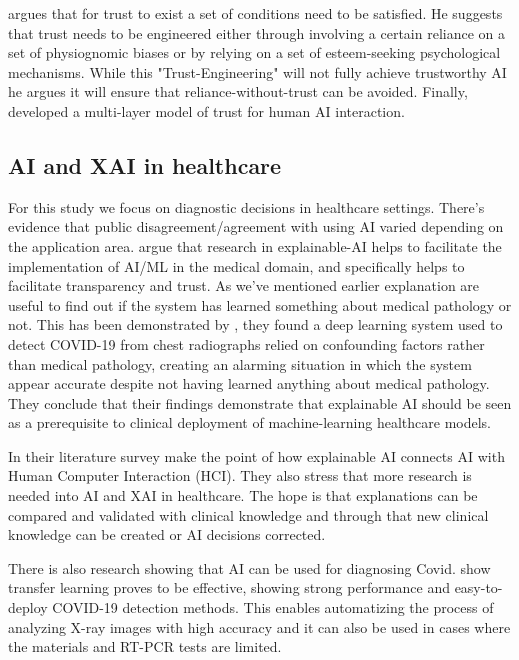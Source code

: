 \documentclass[manuscript,screen,review]{acmart}
\begin{document}
\cite{Chen2021} argues that for trust to exist a set of conditions need to be satisfied.
He suggests that trust needs to be engineered either through involving a certain reliance on a set of physiognomic biases or by relying on a set of esteem-seeking psychological mechanisms. While this "Trust-Engineering" will not fully achieve trustworthy AI he argues it will ensure that reliance-without-trust can be avoided.
Finally, \cite{Ferrario2020} developed a multi-layer model of trust for human AI interaction.

\subsection{AI and XAI in healthcare}\label{subsec:ai-in-healthcare}

For this study we focus on diagnostic decisions in healthcare settings. There's evidence that public disagreement/agreement with using AI varied depending on the application area\cite{Ikkatai2022}.
\cite{Holzinger2017} argue that research in explainable-AI helps to facilitate the implementation of AI/ML in the medical domain, and specifically helps to facilitate transparency and trust.
As we've mentioned earlier explanation are useful to find out if the system has learned something about medical pathology or not.
This has been demonstrated by \cite{DeGrave2021}, they found a deep learning system used to detect COVID-19 from chest radiographs relied on confounding factors rather than medical pathology, creating an alarming situation in which the system appear accurate despite not having learned anything about medical pathology.
They conclude that their findings demonstrate that explainable AI should be seen as a prerequisite to clinical deployment of machine-learning healthcare models.

In their literature survey \cite{Nazar2021} make the point of how explainable AI connects AI with Human Computer Interaction (HCI).
They also stress that more research is needed into AI and XAI in healthcare.
The hope is that explanations can be compared and validated with clinical knowledge and through that new clinical knowledge can be created or AI decisions corrected.

There is also research showing that AI can be used for diagnosing Covid.
\cite{Guefrechi2021} show transfer learning proves to be effective, showing strong performance and easy-to-deploy COVID-19 detection methods.
This enables automatizing the process of analyzing X-ray images with high accuracy and it can also be used in cases where the materials and RT-PCR tests are limited.
\end{document}

